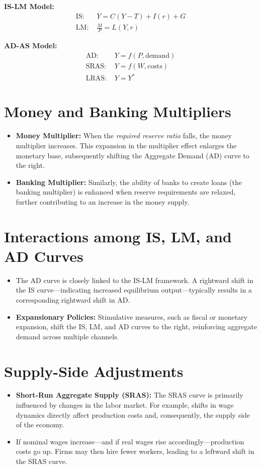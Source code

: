 \textbf{IS-LM Model:}
\begin{align*}
    \text{IS: } & Y = C(Y - T) + I(r) + G \\
    \text{LM: } & \frac{M}{P} = L(Y, r)
\end{align*}

\textbf{AD-AS Model:}
\begin{align*}
    \text{AD: } & Y = f(P, \text{demand}) \\
    \text{SRAS: } & Y = f(W, \text{costs}) \\
    \text{LRAS: } & Y = Y^*
\end{align*}

\section*{Money and Banking Multipliers}
\begin{itemize}
    \item \textbf{Money Multiplier:} When the \emph{required reserve ratio} falls, the money multiplier increases. This expansion in the multiplier effect enlarges the monetary base, subsequently shifting the Aggregate Demand (AD) curve to the right.
    \item \textbf{Banking Multiplier:} Similarly, the ability of banks to create loans (the banking multiplier) is enhanced when reserve requirements are relaxed, further contributing to an increase in the money supply.
\end{itemize}

\section*{Interactions among IS, LM, and AD Curves}
\begin{itemize}
    \item The AD curve is closely linked to the IS-LM framework. A rightward shift in the IS curve—indicating increased equilibrium output—typically results in a corresponding rightward shift in AD.
    \item \textbf{Expansionary Policies:} Stimulative measures, such as fiscal or monetary expansion, shift the IS, LM, and AD curves to the right, reinforcing aggregate demand across multiple channels.
\end{itemize}

\section*{Supply-Side Adjustments}
\begin{itemize}
    \item \textbf{Short-Run Aggregate Supply (SRAS):} The SRAS curve is primarily influenced by changes in the labor market. For example, shifts in wage dynamics directly affect production costs and, consequently, the supply side of the economy.
    \item If nominal wages increase—and if real wages rise accordingly—production costs go up. Firms may then hire fewer workers, leading to a leftward shift in the SRAS curve.
\end{itemize}

